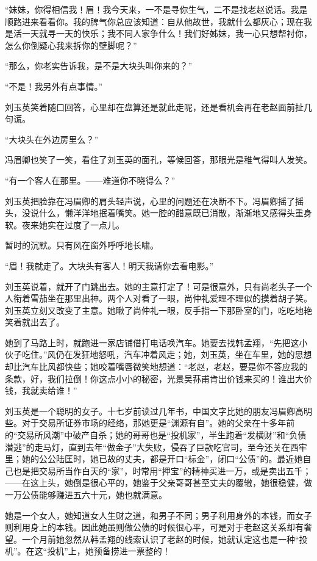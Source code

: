 \par “妹妹，你得相信我！眉！我今天来，一不是寻你生气，二不是找老赵说话。我是顺路进来看看你。我的脾气你总应该知道：自从他故世，我就什么都灰心；现在我是活一天就寻一天的快乐；我不同人家争什么！我们好姊妹，我一心只想帮衬你，怎么你倒疑心我来拆你的壁脚呢？”
\par “那么，你老实告诉我，是不是大块头叫你来的？”
\par “不是！我另外有点事情。”
\par 刘玉英笑着随口回答，心里却在盘算还是就此走呢，还是看机会再在老赵面前扯几句谎。
\par “大块头在外边房里么？”
\par 冯眉卿也笑了一笑，看住了刘玉英的面孔，等候回答，那眼光是稚气得叫人发笑。
\par “有一个客人在那里。——难道你不晓得么？”
\par 刘玉英把脸靠在冯眉卿的肩头轻声说，心里的问题还在决断不下。冯眉卿摇了摇头，没说什么，懒洋洋地抿着嘴笑。她一腔的醋意既已消散，渐渐地又感得头重身软。夜来她实在过度了一点儿。
\par 暂时的沉默。只有风在窗外呼呼地长啸。
\par “眉！我就走了。大块头有客人！明天我请你去看电影。”
\par 刘玉英说着，就开了门跳出去。她的主意打定了！可是很意外，只有尚老头子一个人衔着雪茄坐在那里出神。两个人对看了一眼，尚仲礼爱理不理似的摸着胡子笑。刘玉英立刻又改变了主意。她瞅了尚仲礼一眼，反手指一下那卧室的门，吃吃地艳笑着就出去了。
\par 她到了马路上时，就跑进一家店铺借打电话唤汽车。她要去找韩孟翔，“先把这小伙子吃住。”风仍在发狂地怒吼，汽车冲着风走；她，刘玉英，坐在车里，她的思想却比汽车比风都快些；她咬着嘴唇微笑地想道：“老赵，老赵，要是你不答应我的条款，好，我们拉倒！你这点小小的秘密，光景吴荪甫肯出价钱来买的！谁出大价钱，我就卖给谁！”
\par 刘玉英是一个聪明的女子。十七岁前读过几年书，中国文字比她的朋友冯眉卿高明些。对于交易所证券市场的经络，那她更是“渊源有自”。她的父亲在十多年前的“交易所风潮”中破产自杀；她的哥哥也是“投机家”，半生跑着“发横财”和“负债潜逃”的走马灯，直到去年“做金子”大失败，侵吞了巨款吃官司，至今还关在西牢里；她的公公陆匡时，她已故的丈夫，都是开口“标金”，闭口“公债”的。最近她自己也是把交易所当作白天的“家”，时常用“押宝”的精神买进一万，或是卖出五千；——在这上头，她倒是很心平的，她鉴于父亲哥哥甚至丈夫的覆辙，她很稳健，做一万公债能够赚进五六十元，她也就满意。
\par 她是一个女人，她知道女人生财之道，和男子不同；男子利用身外的本钱，而女子则利用身上的本钱。因此她虽则做公债的时候很心平，可是对于老赵这关系却有奢望。一个月前她忽然从韩孟翔的线索认识了老赵的时候，她就认定这也是一种“投机”。在这“投机”上，她预备捞进一票整的！
